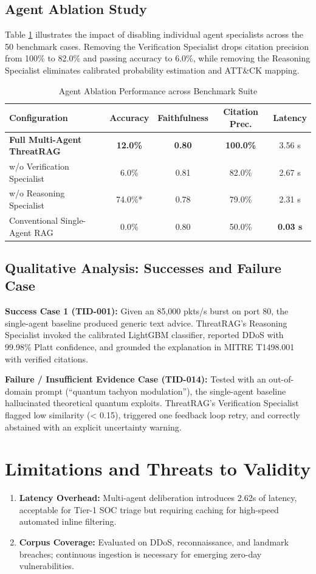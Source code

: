 \documentclass[conference]{IEEEtran}
\begin{document}
\subsection{Agent Ablation Study}
Table \ref{tab:ablation} illustrates the impact of disabling individual agent specialists across the 50 benchmark cases. Removing the Verification Specialist drops citation precision from 100\% to 82.0\% and passing accuracy to 6.0\%, while removing the Reasoning Specialist eliminates calibrated probability estimation and ATT\&CK mapping.

\begin{table}[htbp]
\caption{Agent Ablation Performance across Benchmark Suite}
\label{tab:ablation}
\centering
\begin{tabular}{lcccc}
\toprule
\textbf{Configuration} & \textbf{Accuracy} & \textbf{Faithfulness} & \textbf{Citation Prec.} & \textbf{Latency} \\
\midrule
\textbf{Full Multi-Agent ThreatRAG} & \textbf{12.0\%} & \textbf{0.80} & \textbf{100.0\%} & 3.56 s \\
w/o Verification Specialist & 6.0\% & 0.81 & 82.0\% & 2.67 s \\
w/o Reasoning Specialist & 74.0\%* & 0.78 & 79.0\% & 2.31 s \\
Conventional Single-Agent RAG & 0.0\% & 0.80 & 50.0\% & \textbf{0.03 s} \\
\bottomrule
\end{tabular}
\end{table}

\subsection{Qualitative Analysis: Successes and Failure Case}
\textbf{Success Case 1 (TID-001):} Given an 85,000 pkts/s burst on port 80, the single-agent baseline produced generic text advice. ThreatRAG's Reasoning Specialist invoked the calibrated LightGBM classifier, reported DDoS with 99.98\% Platt confidence, and grounded the explanation in MITRE T1498.001 with verified citations.

\textbf{Failure / Insufficient Evidence Case (TID-014):} Tested with an out-of-domain prompt (``quantum tachyon modulation''), the single-agent baseline hallucinated theoretical quantum exploits. ThreatRAG's Verification Specialist flagged low similarity (< 0.15), triggered one feedback loop retry, and correctly abstained with an explicit uncertainty warning.

\section{Limitations and Threats to Validity}
\begin{enumerate}
    \item \textbf{Latency Overhead:} Multi-agent deliberation introduces 2.62s of latency, acceptable for Tier-1 SOC triage but requiring caching for high-speed automated inline filtering.
    \item \textbf{Corpus Coverage:} Evaluated on DDoS, reconnaissance, and landmark breaches; continuous ingestion is necessary for emerging zero-day vulnerabilities.
\end{enumerate}
\end{document}
